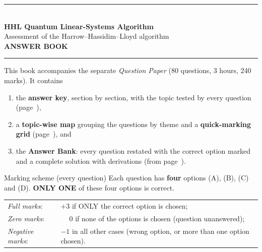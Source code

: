 \documentclass[11pt,a4paper]{article}
\begin{document}
\pagestyle{fancy}\fancyhf{}
\renewcommand{\headrulewidth}{0.4pt}

\thispagestyle{empty}
\begin{center}
{\color{brand}\rule{\linewidth}{1.2pt}}\\[6pt]
{\Huge\bfseries\color{brand} HHL Quantum Linear-Systems Algorithm}\\[4pt]
{\Large Assessment of the Harrow--Hassidim--Lloyd algorithm}\\[4pt]
{\large\bfseries ANSWER BOOK}\\[2pt]
{\color{brand}\rule{\linewidth}{1.2pt}}
\end{center}
This book accompanies the separate \emph{Question Paper} (80 questions, 3 hours, 240 marks). It contains
\begin{enumerate}[leftmargin=1.4em, itemsep=0pt, topsep=2pt]
\item the \textbf{answer key}, section by section, with the topic tested by every question (page~\pageref{key}),
\item a \textbf{topic-wise map} grouping the questions by theme and a \textbf{quick-marking grid} (page~\pageref{topicmap}), and
\item the \textbf{Answer Bank}: every question restated with the correct option marked \textcolor{okgreen}{} and a
      complete solution with derivations (from page~\pageref{bank}).
\end{enumerate}
\begin{infobox}{Marking scheme (every question)}
Each question has \textbf{four} options (A), (B), (C) and (D). \textbf{ONLY ONE} of these four options is correct.\\[2pt]
\begin{tabular}{@{}ll@{}}
\emph{Full marks}: & $+3$ if ONLY the correct option is chosen;\\
\emph{Zero marks}: & $\phantom{+}0$ if none of the options is chosen (question unanswered);\\
\emph{Negative marks}: & $-1$ in all other cases (wrong option, or more than one option chosen).
\end{tabular}
\end{infobox}
\end{document}
